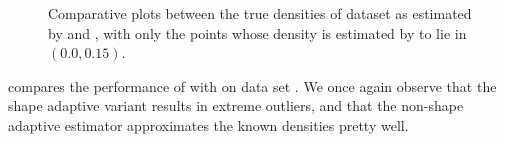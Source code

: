 \begin{figure}
\begin{subfigure}{0.7\columnwidth}
				\caption{\sambe}
				\label{fig:results:baakman4:noOUtliers:sambe}
			\end{subfigure}	
			\caption{Comparative plots between the true densities of dataset \baakmanFour as estimated by  \mbe and  \sambe, with only the points whose density is estimated by \sambe to lie in $\left(\num{0.0}, \num{0.15} \right)$.}
			\label{fig:results:baakman4:noOutliers}
		\end{figure}

		 compares the performance of \mbe with \sambe on data set \numberstringnum{\baakmanFiveNum}. We once again observe that the shape adaptive variant results in extreme outliers, and that the non-shape adaptive estimator approximates the known densities pretty well. 

